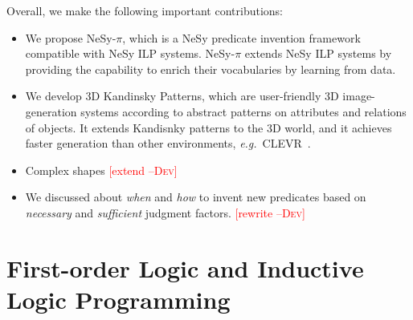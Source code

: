 \documentclass[
]{ceurart}
\newcommand{\dd}[1]{\textcolor{red}{[#1 \textsc{--Dev}]}}
\newcommand{\hk}[1]{\textcolor{Apricot}{[#1 \textsc{--HK}]}}
\newcommand{\eg}{\emph{e.g.}~}
\begin{document}
	
	
	
	Overall, we make the following important contributions:
	
	\begin{itemize}
		\item We propose NeSy-$\pi$, which is a NeSy predicate invention framework compatible with NeSy ILP systems. NeSy-$\pi$ extends NeSy ILP systems by providing the capability to enrich their vocabularies by learning from data.
		\item We develop $3$D Kandinsky Patterns, which are user-friendly 3D image-generation systems according to abstract patterns on attributes and relations of objects. It extends Kandisnky patterns to the 3D world, and it achieves faster generation than other environments, \eg CLEVR~\cite{}.
		\item Complex shapes \dd{extend}
		\item We discussed about \textit{when} and \textit{how} to invent new predicates based on \textit{necessary} and \textit{sufficient} judgment factors. \dd{rewrite}
	\end{itemize}
	
	\section{First-order Logic and Inductive Logic Programming}
	
\end{document}
